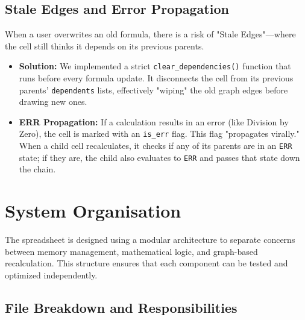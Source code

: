\documentclass[twocolumn]{article}
\begin{document}
\subsection{Stale Edges and Error Propagation}
When a user overwrites an old formula, there is a risk of "Stale Edges"---where the cell still thinks it depends on its previous parents.
\begin{itemize}
    \item \textbf{Solution:} We implemented a strict \texttt{clear\_dependencies()} function that runs before every formula update. It disconnects the cell from its previous parents' \texttt{dependents} lists, effectively "wiping" the old graph edges before drawing new ones.
    \item \textbf{ERR Propagation:} If a calculation results in an error (like Division by Zero), the cell is marked with an \texttt{is\_err} flag. This flag "propagates virally." When a child cell recalculates, it checks if any of its parents are in an \texttt{ERR} state; if they are, the child also evaluates to \texttt{ERR} and passes that state down the chain.
\end{itemize}


\section{System Organisation}

The spreadsheet is designed using a modular architecture to separate concerns between memory management, mathematical logic, and graph-based recalculation. This structure ensures that each component can be tested and optimized independently.

\subsection{File Breakdown and Responsibilities}
\end{document}
